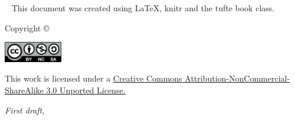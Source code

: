 \begin{fullwidth}
~\vfill
\thispagestyle{empty}
\setlength{\parindent}{0pt}
\setlength{\parskip}{\baselineskip}
This document was created using \LaTeX, knitr and the tufte book class.


Copyright \copyright\ \the\year\ \thanklessauthor


\leavevmode
\includegraphics[width=1in]{figures/license.png}
\label{fig:cc}

\scriptsize{This work is licensed under a \href{http://creativecommons.org/licenses/by-nc-sa/3.0/deed.en_US}{Creative Commons Attribution-NonCommercial-ShareAlike 3.0 Unported License.}}


\par\textit{First draft, \monthyear}
\end{fullwidth} 
